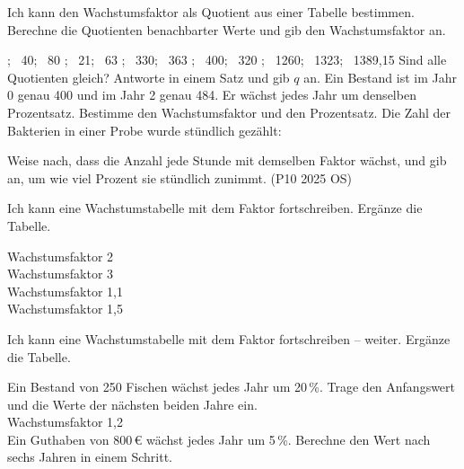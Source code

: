 \begin{aufgabe}{Ich kann den Wachstumsfaktor als Quotient aus einer Tabelle bestimmen.}
Berechne die Quotienten benachbarter Werte und gib den Wachstumsfaktor an.
\begin{teile}
; \ 40; \ 80 \quad {}
; \ 21; \ 63 \quad {}
; \ 330; \ 363 \quad {}
; \ 400; \ 320 \quad {}
; \ 1260; \ 1323; \ 1389,15 \quad Sind alle Quotienten gleich? Antworte in einem Satz und gib $q$ an.
\teil Ein Bestand ist im Jahr 0 genau 400 und im Jahr 2 genau 484. Er wächst jedes Jahr um denselben Prozentsatz. Bestimme den Wachstumsfaktor und den Prozentsatz.
\teil Die Zahl der Bakterien in einer Probe wurde stündlich gezählt:


Weise nach, dass die Anzahl jede Stunde mit demselben Faktor wächst, und gib an, um wie viel Prozent sie stündlich zunimmt. (P10 2025 OS)
\end{teile}
\end{aufgabe}


\begin{aufgabe}{Ich kann eine Wachstumstabelle mit dem Faktor fortschreiben.}
Ergänze die Tabelle.
\begin{teile}
\teil Wachstumsfaktor 2 \\ 
\teil Wachstumsfaktor 3 \\ 
\teil Wachstumsfaktor 1,1 \\ 
\teil Wachstumsfaktor 1,5 \\ 
\end{teile}
\end{aufgabe}

\begin{aufgabe}{Ich kann eine Wachstumstabelle mit dem Faktor fortschreiben – weiter.}
Ergänze die Tabelle.
\begin{teile}
\teil Ein Bestand von 250 Fischen wächst jedes Jahr um 20\,\%. Trage den Anfangswert und die Werte der nächsten beiden Jahre ein. \\ 
\teil Wachstumsfaktor 1,2 \\ 
\teil Ein Guthaben von 800\,€ wächst jedes Jahr um 5\,\%. Berechne den Wert nach sechs Jahren in einem Schritt. \\ 
\end{teile}
\end{aufgabe}

